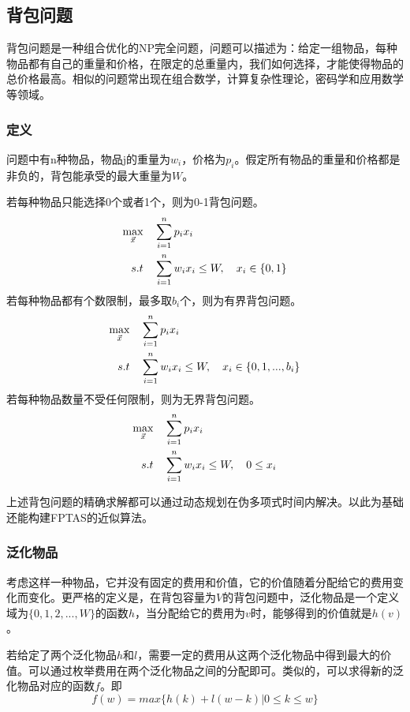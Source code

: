 \documentclass[promaster]{thesis-uestc}
\begin{document}
\subsection{背包问题}
背包问题是一种组合优化的NP完全问题，问题可以描述为：给定一组物品，每种物品都有自己的重量和价格，在限定的总重量内，我们如何选择，才能使得物品的总价格最高。相似的问题常出现在组合数学，计算复杂性理论，密码学和应用数学等领域。
\subsubsection{定义}
问题中有n种物品，物品j的重量为$w_i$，价格为$p_i$。假定所有物品的重量和价格都是非负的，背包能承受的最大重量为$W$。

若每种物品只能选择0个或者1个，则为0-1背包问题。
\begin{align}
    \max_{\vec{x}} \quad&\sum_{i=1}^{n}{p_ix_i}\\
    s.t                     
                            \quad& \sum_{i=1}^{n}{w_ix_i} \leq W,\quad x_i\in\{0,1\}\notag 
\end{align}
若每种物品都有个数限制，最多取$b_i$个，则为有界背包问题。
\begin{align}
    \max_{\vec{x}} \quad&\sum_{i=1}^{n}{p_ix_i}\\
    s.t                     
                            \quad& \sum_{i=1}^{n}{w_ix_i} \leq W,\quad x_i\in\{0,1,...,b_i\}\notag 
\end{align}
若每种物品数量不受任何限制，则为无界背包问题。
\begin{align}
    \max_{\vec{x}} \quad&\sum_{i=1}^{n}{p_ix_i}\\
    s.t                     
                            \quad& \sum_{i=1}^{n}{w_ix_i} \leq W,\quad 0\leq x_i\notag 
\end{align}

上述背包问题的精确求解都可以通过动态规划在伪多项式时间内解决。以此为基础还能构建FPTAS的近似算法。
\subsubsection{泛化物品}
考虑这样一种物品，它并没有固定的费用和价值，它的价值随着分配给它的费用变化而变化。更严格的定义是，在背包容量为$V$的背包问题中，泛化物品是一个定义域为$\{0,1,2,...,W\}$的函数$h$，当分配给它的费用为$v$时，能够得到的价值就是$h(v)$。

若给定了两个泛化物品$h$和$l$，需要一定的费用从这两个泛化物品中得到最大的价值。可以通过枚举费用在两个泛化物品之间的分配即可。类似的，可以求得新的泛化物品对应的函数$f$。即
\begin{equation}
    f(w)=max\{h(k)+l(w-k)|0\leq k \leq w\}
\end{equation}
\end{document}
